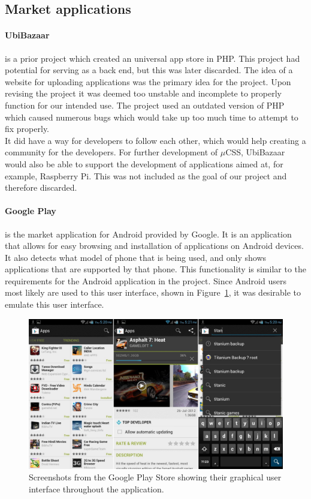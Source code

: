 \subsection{Market applications}
\label{sec:googleplay}
\paragraph{UbiBazaar} is a prior project which created an universal app store in PHP. This project had potential for serving as a back end, but this was later discarded. The idea of a website for uploading applications was the primary idea for the project. Upon revising the project it was deemed too unstable and incomplete to properly function for our intended use. The project used an outdated version of PHP which caused numerous bugs which would take up too much time to attempt to fix properly.\\

It did have a way for developers to follow each other, which would help creating a community for the developers. For further development of $\mu$CSS, UbiBazaar would also be able to support the development of applications aimed at, for example, Raspberry Pi. This was not included as the goal of our project and therefore discarded.

\paragraph{Google Play} is the market application for Android provided by Google. It is an application that allows for easy browsing and installation of applications on Android devices. It also detects what model of phone that is being used, and only shows applications that are supported by that phone. This functionality is similar to the requirements for the Android application in the project. Since Android users most likely are used to this user interface, shown in Figure~\ref{fig:googleplay}, it was desirable to emulate this user interface.\\

\begin{figure}[H]
\centering
\includegraphics[scale=0.2]{images/Google-Play-Store-APK-3-7-15.jpg}
\caption[Google Play]{Screenshots from the Google Play Store showing their graphical user interface throughout the application.}
\label{fig:googleplay}
\end{figure}

